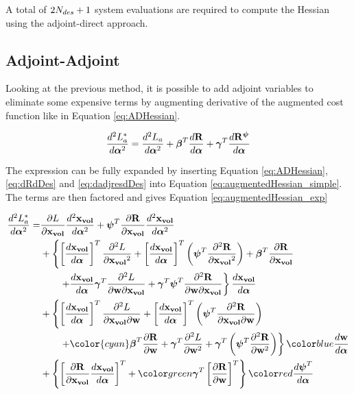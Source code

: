 \documentclass[letterpaper,12pt,]{article}
\begin{document}
A total of $2N_{des}+1$ system evaluations are required to compute the Hessian using the adjoint-direct approach.

\newpage
\subsection*{Adjoint-Adjoint}
Looking at the previous method, it is possible to add adjoint variables to eliminate some expensive terms by augmenting derivative of the augmented cost function like in Equation \ref{eq:ADHessian}.

\begin{equation}
	\dfrac{d^2L_a^*}{d\boldsymbol{\alpha}^2} = 
	\dfrac{d^2L_a}{d\boldsymbol{\alpha}^2}
	+
	\boldsymbol{\beta}^T
	\dfrac{d\mathbf{R}}{d\boldsymbol{\alpha}}
	+
	\boldsymbol{\gamma}^T
	\dfrac{d\mathbf{R}^{\boldsymbol{\psi}}}{d\boldsymbol{\alpha}}
\label{eq:augmentedHessian_simple}
\end{equation}

The expression can be fully expanded by inserting Equation \ref{eq:ADHessian}, \ref{eq:dRdDes} and \ref{eq:dadjresdDes} into Equation \ref{eq:augmentedHessian_simple}.
The terms are then factored and gives Equation \ref{eq:augmentedHessian_exp}

\begin{equation}
\begin{split}
	\DDt{L_a^*}{\balfa} = 
	&
	\del{L}{\xvol}
	\DDt{\xvol}{\balfa}
	+
	\bpsi^T
	\del{\bR}{\xvol}
	\DDt{\xvol}{\balfa}
	\\&
	+
	\left\{
		\trans{\Dt{\xvol}{\balfa}}
		\ddel{L}{\xvol}
		+
		\trans{\Dt{\xvol}{\balfa}}
		\left(
		\bpsi^T
		\ddel{\bR}{\xvol}
		\right)
		+
		\bbeta^T
			\del{\bR}{\xvol}
		\right.\\&\left. \quad\quad
		+
		\Dt{\xvol}{\balfa}
		\bgam^T
		\ddelm{L}{\bw}{\xvol}
		+
		\bgam^T
		\bpsi^T
		\ddelm{\bR}{\bw}{\xvol}
	\right\}
	\Dt{\xvol}{\balfa}
	\\&+
	\left\{
		\trans{\Dt{\xvol}{\balfa}}
		\ddelm{L}{\xvol}{\bw}
		+
		\trans{\Dt{\xvol}{\balfa}}
		\left(
		\bpsi^T
		\ddelm{\bR}{\xvol}{\bw}
		\right)
	\right.\\&\left. \quad\quad
		+
		{\color{cyan}\bbeta}^T
		\del{\bR}{\bw}
		+
		\bgam^T
		\ddel{L}{\bw}
		+
		\bgam^T
		\left(
		\bpsi^T
		\ddel{\bR}{\bw}
		\right)
	\right\}
	\blue{\Dt{\bw}{\balfa}}
	\\&
	+
	\left\{
		\trans{
		\del{\bR}{\xvol}
		\Dt{\xvol}{\balfa}
		}
		+
		\green{\bgam}^T
		\trans{\del{\bR}{\bw}}
	\right\}
	\red{\Dt{\bpsi^T}{\balfa}}
\label{eq:augmentedHessian_exp}
\end{split}
\end{equation}
\end{document}
